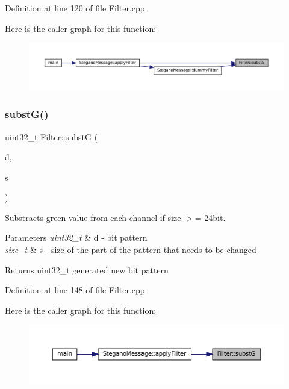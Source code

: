 Definition at line 120 of file Filter.\+cpp.

Here is the caller graph for this function\+:
\nopagebreak
\begin{figure}[H]
\begin{center}
\leavevmode
\includegraphics[width=350pt]{classFilter_a3f2bbadc0138195cebf84bd8ce8d9892_icgraph}
\end{center}
\end{figure}
\mbox{\label{classFilter_afc6fee2bd138d157986ef3e2f2907186}} 
\subsubsection{\texorpdfstring{substG()}{substG()}}
{\footnotesize\ttfamily uint32\+\_\+t Filter\+::substG (\begin{DoxyParamCaption}\item[{uint32\+\_\+t}]{d,  }\item[{size\+\_\+t}]{s }\end{DoxyParamCaption})\hspace{0.3cm}{\ttfamily [static]}}



Substracts green value from each channel if size $>$= 24bit. 


\begin{DoxyParams}{Parameters}
{\em uint32\+\_\+t} & d -\/ bit pattern \\
\hline
{\em size\+\_\+t} & s -\/ size of the part of the pattern that needs to be changed \\
\hline
\end{DoxyParams}
\begin{DoxyReturn}{Returns}
uint32\+\_\+t generated new bit pattern 
\end{DoxyReturn}


Definition at line 148 of file Filter.\+cpp.

Here is the caller graph for this function\+:
\nopagebreak
\begin{figure}[H]
\begin{center}
\leavevmode
\includegraphics[width=350pt]{classFilter_afc6fee2bd138d157986ef3e2f2907186_icgraph}
\end{center}
\end{figure}
\mbox{\label{classFilter_a773ee633720080079d6a17ac610d353d}} 
